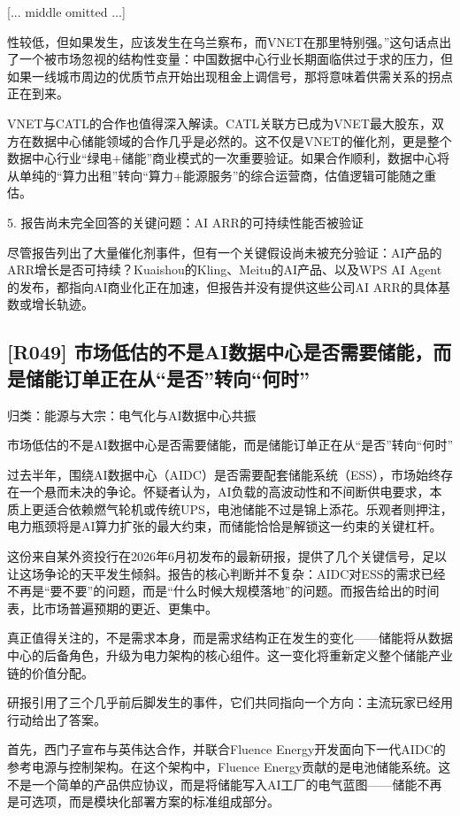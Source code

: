 \documentclass[11pt]{ctexart}
\begin{document}
[... middle omitted ...]

性较低，但如果发生，应该发生在乌兰察布，而VNET在那里特别强。”这句话点出了一个被市场忽视的结构性变量：中国数据中心行业长期面临供过于求的压力，但如果一线城市周边的优质节点开始出现租金上调信号，那将意味着供需关系的拐点正在到来。

VNET与CATL的合作也值得深入解读。CATL关联方已成为VNET最大股东，双方在数据中心储能领域的合作几乎是必然的。这不仅是VNET的催化剂，更是整个数据中心行业“绿电+储能”商业模式的一次重要验证。如果合作顺利，数据中心将从单纯的“算力出租”转向“算力+能源服务”的综合运营商，估值逻辑可能随之重估。

5. 报告尚未完全回答的关键问题：AI ARR的可持续性能否被验证

尽管报告列出了大量催化剂事件，但有一个关键假设尚未被充分验证：AI产品的ARR增长是否可持续？Kuaishou的Kling、Meitu的AI产品、以及WPS AI Agent的发布，都指向AI商业化正在加速，但报告并没有提供这些公司AI ARR的具体基数或增长轨迹。

\subsection{[R049] 市场低估的不是AI数据中心是否需要储能，而是储能订单正在从“是否”转向“何时”}
{\small\color{refgray}归类：能源与大宗：电气化与AI数据中心共振}

市场低估的不是AI数据中心是否需要储能，而是储能订单正在从“是否”转向“何时”

过去半年，围绕AI数据中心（AIDC）是否需要配套储能系统（ESS），市场始终存在一个悬而未决的争论。怀疑者认为，AI负载的高波动性和不间断供电要求，本质上更适合依赖燃气轮机或传统UPS，电池储能不过是锦上添花。乐观者则押注，电力瓶颈将是AI算力扩张的最大约束，而储能恰恰是解锁这一约束的关键杠杆。

这份来自某外资投行在2026年6月初发布的最新研报，提供了几个关键信号，足以让这场争论的天平发生倾斜。报告的核心判断并不复杂：AIDC对ESS的需求已经不再是“要不要”的问题，而是“什么时候大规模落地”的问题。而报告给出的时间表，比市场普遍预期的更近、更集中。

真正值得关注的，不是需求本身，而是需求结构正在发生的变化——储能将从数据中心的后备角色，升级为电力架构的核心组件。这一变化将重新定义整个储能产业链的价值分配。

研报引用了三个几乎前后脚发生的事件，它们共同指向一个方向：主流玩家已经用行动给出了答案。

首先，西门子宣布与英伟达合作，并联合Fluence Energy开发面向下一代AIDC的参考电源与控制架构。在这个架构中，Fluence Energy贡献的是电池储能系统。这不是一个简单的产品供应协议，而是将储能写入AI工厂的电气蓝图——储能不再是可选项，而是模块化部署方案的标准组成部分。
\end{document}

